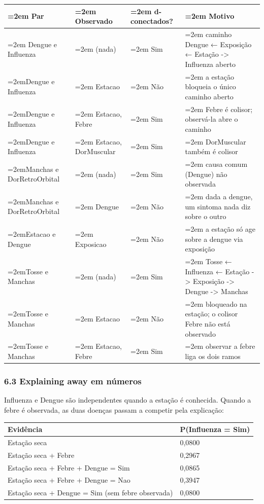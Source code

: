 \documentclass[12pt, a4paper]{article}
\begin{document}
\begingroup
\setlength{\tabcolsep}{4.0pt}
\begin{longtable}{@{}>{\raggedright\hyphenpenalty=30\tolerance=999\emergencystretch=2em\arraybackslash}p{3.04cm}>{\raggedright\hyphenpenalty=30\tolerance=999\emergencystretch=2em\arraybackslash}p{2.65cm}>{\raggedright\hyphenpenalty=30\tolerance=999\emergencystretch=2em\arraybackslash}p{2.74cm}>{\raggedright\hyphenpenalty=30\tolerance=999\emergencystretch=2em\arraybackslash}p{6.01cm}@{}}
\toprule\noalign{}
Par & Observado & d-conectados? & Motivo \\
\midrule\noalign{}
\endhead
\bottomrule\noalign{}
\endlastfoot
Dengue e Influenza & (nada\allowbreak ) & Sim & caminho Dengue ← Exposição ← Estação -> Influenza aberto \\
Dengue e Influenza & Estacao & Não & a estação bloqueia o único caminho aberto \\
Dengue e Influenza & Estacao, Febre & Sim & Febre é colisor; observá-la abre o caminho \\
Dengue e Influenza & Estacao, DorMuscular & Sim & DorMuscular também é colisor \\
Manchas e DorRetroOrbital & (nada\allowbreak ) & Sim & causa comum (Dengue\allowbreak ) não observada \\
Manchas e DorRetroOrbital & Dengue & Não & dada a dengue, um sintoma nada diz sobre o outro \\
Estacao e Dengue & Exposicao & Não & a estação só age sobre a dengue via exposição \\
Tosse e Manchas & (nada\allowbreak ) & Sim & Tosse ← Influenza ← Estação -> Exposição -> Dengue -> Manchas \\
Tosse e Manchas & Estacao & Não & bloqueado na estação; o colisor Febre não está observado \\
Tosse e Manchas & Estacao, Febre & Sim & observar a febre liga os dois ramos \\
\end{longtable}
\endgroup

\subsubsection{6.3 Explaining away em números}\label{63-explaining-away-em-nuxfameros}

Influenza e Dengue são independentes quando a estação é conhecida. Quando a febre é observada, as duas doenças passam a competir pela explicação:

\begin{longtable}{@{}ll@{}}
\toprule\noalign{}
Evidência & P(Influenza = Sim\allowbreak ) \\
\midrule\noalign{}
\endhead
\bottomrule\noalign{}
\endlastfoot
Estação seca & 0,0800 \\
Estação seca + Febre & 0,2967 \\
Estação seca + Febre + Dengue = Sim & 0,0865 \\
Estação seca + Febre + Dengue = Nao & 0,3947 \\
Estação seca + Dengue = Sim (sem febre observada\allowbreak ) & 0,0800 \\
\end{longtable}
\end{document}
